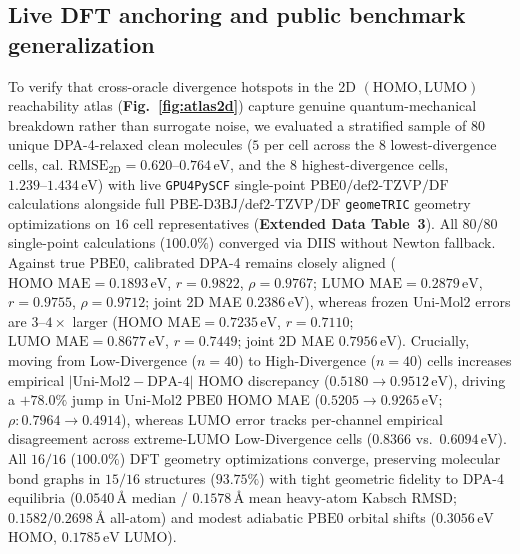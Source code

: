\documentclass[11pt,a4paper]{article}
\begin{document}
\subsection*{Live DFT anchoring and public benchmark generalization}

To verify that cross-oracle divergence hotspots in the 2D $(\text{HOMO},\text{LUMO})$ reachability atlas (\textbf{Fig.~\ref{fig:atlas2d}}) capture genuine quantum-mechanical breakdown rather than surrogate noise, we evaluated a stratified sample of $80$ unique DPA-4-relaxed clean molecules ($5$ per cell across the $8$ lowest-divergence cells, $\text{cal.\ RMSE}_{2\text{D}} = 0.620\text{--}0.764\,\text{eV}$, and the $8$ highest-divergence cells, $1.239\text{--}1.434\,\text{eV}$) with live \texttt{GPU4PySCF} single-point $\text{PBE0/def2-TZVP/DF}$ calculations alongside full $\text{PBE-D3BJ/def2-TZVP/DF}$ \texttt{geomeTRIC} geometry optimizations on $16$ cell representatives (\textbf{Extended Data Table~3})\cite{sun2020pyscf,li2024gpu4pyscf}. All $80/80$ single-point calculations ($100.0\%$) converged via DIIS without Newton fallback. Against true $\text{PBE0}$, calibrated DPA-4\cite{deepmodeling2026dpa4} remains closely aligned ($\text{HOMO MAE}=0.1893\,\text{eV}$, $r=0.9822$, $\rho=0.9767$; $\text{LUMO MAE}=0.2879\,\text{eV}$, $r=0.9755$, $\rho=0.9712$; joint 2D MAE $0.2386\,\text{eV}$), whereas frozen Uni-Mol2\cite{ji2024unimol2} errors are $3\text{--}4\times$ larger ($\text{HOMO MAE}=0.7235\,\text{eV}$, $r=0.7110$; $\text{LUMO MAE}=0.8677\,\text{eV}$, $r=0.7449$; joint 2D MAE $0.7956\,\text{eV}$). Crucially, moving from Low-Divergence ($n=40$) to High-Divergence ($n=40$) cells increases empirical $|\text{Uni-Mol2}-\text{DPA-4}|$ HOMO discrepancy ($0.5180 \to 0.9512\,\text{eV}$), driving a $+78.0\%$ jump in Uni-Mol2 $\text{PBE0}$ HOMO MAE ($0.5205 \to 0.9265\,\text{eV}$; $\rho: 0.7964 \to 0.4914$), whereas LUMO error tracks per-channel empirical disagreement across extreme-LUMO Low-Divergence cells ($0.8366$ vs.\ $0.6094\,\text{eV}$). All $16/16$ ($100.0\%$) DFT geometry optimizations converge, preserving molecular bond graphs in $15/16$ structures ($93.75\%$) with tight geometric fidelity to DPA-4 equilibria ($0.0540\,\text{\AA}$ median / $0.1578\,\text{\AA}$ mean heavy-atom Kabsch RMSD; $0.1582 / 0.2698\,\text{\AA}$ all-atom) and modest adiabatic $\text{PBE0}$ orbital shifts ($0.3056\,\text{eV}$ HOMO, $0.1785\,\text{eV}$ LUMO).
\end{document}
